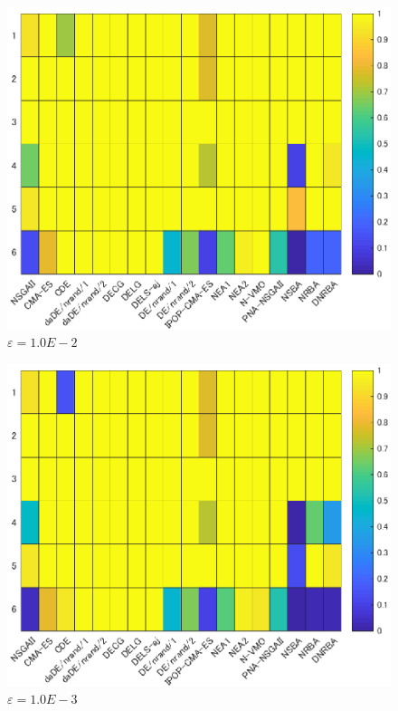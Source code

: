 \documentclass[a4j,11pt]{jarticle}
\begin{document}
\begin{figure}
\centering
\includegraphics[width=0.8\linewidth]{eps/E-2.eps}
\caption{$\varepsilon = 1.0E-2$}
\label{fig:resutls_comp_E2}
\end{figure}

\begin{figure}
\centering
\includegraphics[width=0.8\linewidth]{eps/E-3.eps}
\caption{$\varepsilon = 1.0E-3$}
\label{fig:resutls_comp_E3}
\end{figure}
\end{document}
